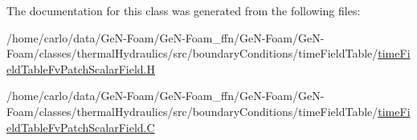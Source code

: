 The documentation for this class was generated from the following files\+:\begin{DoxyCompactItemize}
\item 
/home/carlo/data/\+Ge\+N-\/\+Foam/\+Ge\+N-\/\+Foam\+\_\+ffn/\+Ge\+N-\/\+Foam/\+Ge\+N-\/\+Foam/classes/thermal\+Hydraulics/src/boundary\+Conditions/time\+Field\+Table/\hyperlink{timeFieldTableFvPatchScalarField_8H}{time\+Field\+Table\+Fv\+Patch\+Scalar\+Field.\+H}\item 
/home/carlo/data/\+Ge\+N-\/\+Foam/\+Ge\+N-\/\+Foam\+\_\+ffn/\+Ge\+N-\/\+Foam/\+Ge\+N-\/\+Foam/classes/thermal\+Hydraulics/src/boundary\+Conditions/time\+Field\+Table/\hyperlink{timeFieldTableFvPatchScalarField_8C}{time\+Field\+Table\+Fv\+Patch\+Scalar\+Field.\+C}\end{DoxyCompactItemize}
